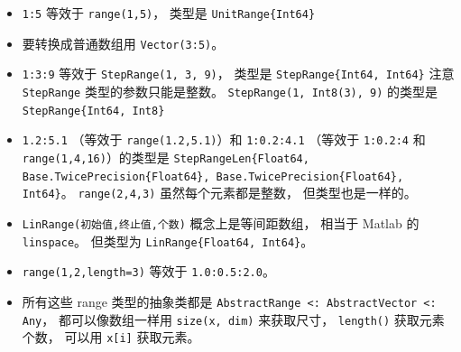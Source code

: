 \begin{itemize}
\item \verb`1:5` 等效于 \verb`range(1,5)`， 类型是 \verb`UnitRange{Int64}`
\item 要转换成普通数组用 \verb`Vector(3:5)`。
\item \verb`1:3:9` 等效于 \verb`StepRange(1, 3, 9)`， 类型是 \verb`StepRange{Int64, Int64}` 注意 \verb`StepRange` 类型的参数只能是整数。 \verb`StepRange(1, Int8(3), 9)` 的类型是 \verb`StepRange{Int64, Int8}`
\item \verb`1.2:5.1` （等效于 \verb`range(1.2,5.1)`）和 \verb`1:0.2:4.1` （等效于 \verb`1:0.2:4` 和 \verb`range(1,4,16)`）的类型是 \verb`StepRangeLen{Float64, Base.TwicePrecision{Float64}, Base.TwicePrecision{Float64}, Int64}`。 \verb`range(2,4,3)` 虽然每个元素都是整数， 但类型也是一样的。
\item \verb`LinRange(初始值,终止值,个数)` 概念上是等间距数组， 相当于 Matlab 的 \verb`linspace`。 但类型为 \verb`LinRange{Float64, Int64}`。
\item \verb`range(1,2,length=3)` 等效于 \verb`1.0:0.5:2.0`。
\item 所有这些 range 类型的抽象类都是 \verb`AbstractRange <: AbstractVector <: Any`， 都可以像数组一样用 \verb`size(x, dim)` 来获取尺寸， \verb`length()` 获取元素个数， 可以用 \verb`x[i]` 获取元素。
\end{itemize}


